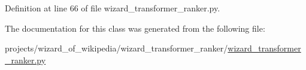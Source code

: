 Definition at line 66 of file wizard\+\_\+transformer\+\_\+ranker.\+py.



The documentation for this class was generated from the following file\+:\begin{DoxyCompactItemize}
\item 
projects/wizard\+\_\+of\+\_\+wikipedia/wizard\+\_\+transformer\+\_\+ranker/\hyperlink{wizard__transformer__ranker_8py}{wizard\+\_\+transformer\+\_\+ranker.\+py}\end{DoxyCompactItemize}
